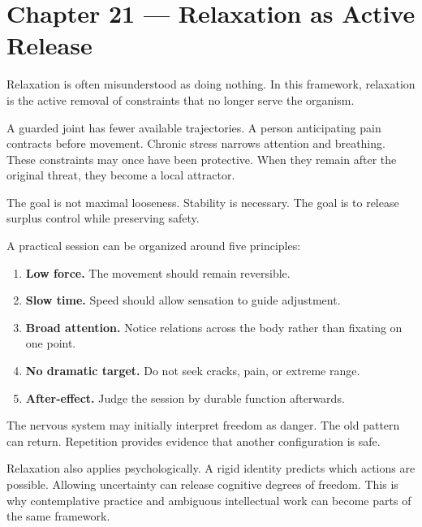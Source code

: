 \chapter{Chapter 21 --- Relaxation as Active Release}\label{chapter-21-relaxation-as-active-release}

Relaxation is often misunderstood as doing nothing. In this framework, relaxation is the active removal of constraints that no longer serve the organism.

A guarded joint has fewer available trajectories. A person anticipating pain contracts before movement. Chronic stress narrows attention and breathing. These constraints may once have been protective. When they remain after the original threat, they become a local attractor.

The goal is not maximal looseness. Stability is necessary. The goal is to release surplus control while preserving safety.

A practical session can be organized around five principles:

\begin{enumerate}
\def\labelenumi{\arabic{enumi}.}
\tightlist
\item
  \textbf{Low force.} The movement should remain reversible.
\item
  \textbf{Slow time.} Speed should allow sensation to guide adjustment.
\item
  \textbf{Broad attention.} Notice relations across the body rather than fixating on one point.
\item
  \textbf{No dramatic target.} Do not seek cracks, pain, or extreme range.
\item
  \textbf{After-effect.} Judge the session by durable function afterwards.
\end{enumerate}

The nervous system may initially interpret freedom as danger. The old pattern can return. Repetition provides evidence that another configuration is safe.

Relaxation also applies psychologically. A rigid identity predicts which actions are possible. Allowing uncertainty can release cognitive degrees of freedom. This is why contemplative practice and ambiguous intellectual work can become parts of the same framework.
